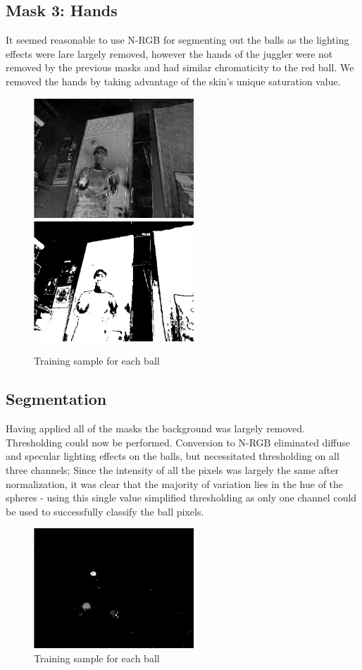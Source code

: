 \documentclass[10pt,a4paper,oneclumn]{article}
\begin{document}
\subsection{Mask 3: Hands}
It seemed reasonable to use N-RGB for segmenting out the balls as the lighting effects were lare largely removed, however the hands of the juggler were not removed by the previous masks and had similar chromaticity to the red ball. We removed the hands by taking advantage of the skin's unique saturation value.

\begin{figure}
\centering
  \includegraphics[width=6cm]{figures/imsat.png}
  \includegraphics[width=6cm]{figures/imhsvsatmask.png}
\caption{Training sample for each ball}
\end{figure}

\subsection{Segmentation}

Having applied all of the masks the background was largely removed. Thresholding could now be performed. Conversion to N-RGB eliminated diffuse and specular lighting effects on the balls, but necessitated thresholding on all three channels; Since the intensity of all the pixels was largely the same after normalization, it was clear that the majority of variation lies in the hue of the spheres - using this single value simplified thresholding as only one channel could be used to successfully classify the ball pixels. 

\begin{figure}
\centering
  \includegraphics[width=6cm]{figures/bgremoved.png}
\caption{Training sample for each ball}
\end{figure}
\end{document}
